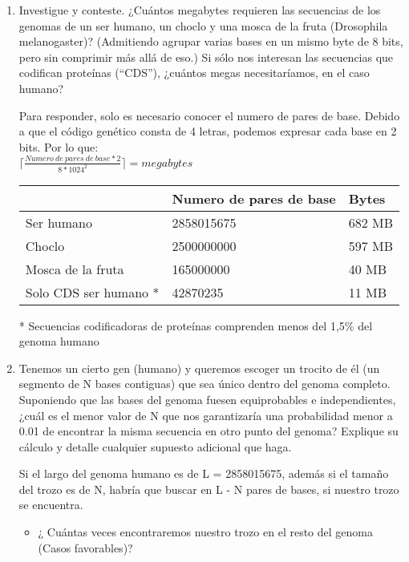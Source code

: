 \begin{enumerate}
\item Investigue y conteste. ¿Cuántos megabytes requieren las secuencias de los genomas de un ser
humano, un choclo y una mosca de la fruta (Drosophila melanogaster)? (Admitiendo agrupar varias
bases en un mismo byte de 8 bits, pero sin comprimir más allá de eso.) Si sólo nos interesan las
secuencias que codifican proteínas (“CDS”), ¿cuántos megas necesitaríamos, en el caso humano?

Para responder, solo es necesario conocer el numero de pares de base. Debido a que el código genético
consta de 4 letras, podemos expresar cada base en 2 bits. Por lo que: \\

$ \lceil \frac{Numero \ de \ pares \ de \ base * 2}{8 * 1024^2} \rceil = megabytes$ \\

\begin{tabular}{|l|l|l|}
\hline
 & Numero de pares de base & Bytes \\
\hline
Ser humano        & 2858015675 & 682 MB\\
Choclo            & 2500000000 & 597 MB\\
Mosca de la fruta & 165000000  & 40 MB\\
Solo CDS ser humano *  & 42870235   & 11 MB\\
\hline
\end{tabular}

* Secuencias codificadoras de proteínas comprenden menos del 1,5\% del genoma humano

\item Tenemos un cierto gen (humano) y queremos escoger un trocito de él (un segmento de N bases
contiguas) que sea único dentro del genoma completo. Suponiendo que las bases del genoma fuesen
equiprobables e independientes, ¿cuál es el menor valor de N que nos garantizaría una probabilidad
menor a 0.01 de encontrar la misma secuencia en otro punto del genoma? Explique su cálculo y detalle
cualquier supuesto adicional que haga.

Si el largo del genoma humano es de L = 2858015675, además si el tamaño del trozo es de N, habría que buscar en
L - N pares de bases, si nuestro trozo se encuentra.\\

\begin{itemize}

\item ¿ Cuántas veces encontraremos nuestro trozo en el resto del genoma (Casos favorables)?


\end{itemize}
\end{enumerate}
